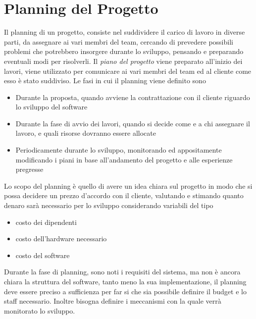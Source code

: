 \documentclass[10pt, letterpaper]{report}
\begin{document}
\chapter{Planning del Progetto}\label{planningProj}
Il planning di un progetto, consiste nel suddividere il carico di lavoro in diverse 
parti, da assegnare ai vari membri del team, cercando di prevedere possibili problemi 
che potrebbero insorgere durante lo sviluppo, pensando e preparando eventuali modi per 
risolverli.\acc 
Il \textit{piano del progetto} viene preparato all'inizio dei lavori, viene utilizzato per 
comunicare ai vari membri del team ed al cliente come esso è stato suddiviso. Le fasi in cui 
il planning viene definito sono \begin{itemize}
    \item Durante la proposta, quando avviene la contrattazione con il cliente riguardo lo sviluppo del 
    software 
    \item Durante la fase di avvio dei lavori, quando si decide come e a chi assegnare il lavoro, e 
    quali risorse dovranno essere allocate 
    \item Periodicamente durante lo sviluppo, monitorando ed appositamente modificando i piani in base 
    all'andamento del progetto e alle esperienze pregresse
\end{itemize}
Lo scopo del planning è quello di avere un idea chiara sul progetto in modo che si possa decidere 
un prezzo d'accordo con il cliente, valutando e stimando quanto denaro sarà necessario per 
lo sviluppo considerando variabili del tipo \begin{itemize}
    \item costo dei dipendenti 
    \item costo dell'hardware necessario 
    \item costo del software
\end{itemize}
Durante la fase di planning, sono noti i requisiti del sistema, ma non è ancora chiara la 
struttura del software, tanto meno la sua implementazione, il planning deve essere 
preciso a sufficienza per far si che sia possibile definire il budget e lo staff necessario. 
Inoltre bisogna definire i meccanismi con la quale verrà monitorato lo sviluppo.
\flowerLine
\end{document}
